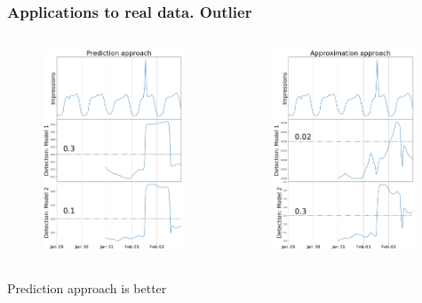 \documentclass[intlimits, 9pt, unicode]{beamer}
\begin{document}
\begin{frame}
    \frametitle{Applications to real data. Outlier}
  \begin{columns}[T,onlytextwidth]
	\begin{figure}
	\includegraphics[height=6cm]{images/methods_comparison_2_1}
	\end{figure}
	
	\begin{figure}
	\includegraphics[height=6cm]{images/methods_comparison_2_2}
	\end{figure}
	
     \end{columns}

 \medskip
    \qquad Prediction approach is better

\end{frame}
\end{document}
